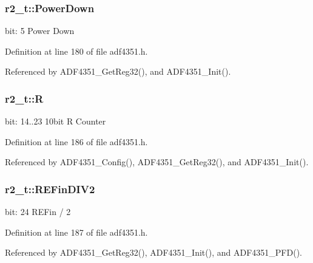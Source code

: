 \subsubsection[{\texorpdfstring{Power\+Down}{PowerDown}}]{ r2\+\_\+t\+::\+Power\+Down}\hypertarget{structr2__t_a3aadc869234fb281b178032be276ca00}{}\label{structr2__t_a3aadc869234fb281b178032be276ca00}
bit\+: 5 Power Down 

Definition at line 180 of file adf4351.\+h.



Referenced by A\+D\+F4351\+\_\+\+Get\+Reg32(), and A\+D\+F4351\+\_\+\+Init().

\subsubsection[{\texorpdfstring{R}{R}}]{ r2\+\_\+t\+::R}\hypertarget{structr2__t_a0abc2956b7cbc989552c17264973d24d}{}\label{structr2__t_a0abc2956b7cbc989552c17264973d24d}
bit\+: 14..23 10bit R Counter 

Definition at line 186 of file adf4351.\+h.



Referenced by A\+D\+F4351\+\_\+\+Config(), A\+D\+F4351\+\_\+\+Get\+Reg32(), and A\+D\+F4351\+\_\+\+Init().

\subsubsection[{\texorpdfstring{R\+E\+Fin\+D\+I\+V2}{REFinDIV2}}]{ r2\+\_\+t\+::\+R\+E\+Fin\+D\+I\+V2}\hypertarget{structr2__t_aa036b7abbb6147e0c155101addc1490c}{}\label{structr2__t_aa036b7abbb6147e0c155101addc1490c}
bit\+: 24 R\+E\+Fin / 2 

Definition at line 187 of file adf4351.\+h.



Referenced by A\+D\+F4351\+\_\+\+Get\+Reg32(), A\+D\+F4351\+\_\+\+Init(), and A\+D\+F4351\+\_\+\+P\+F\+D().

